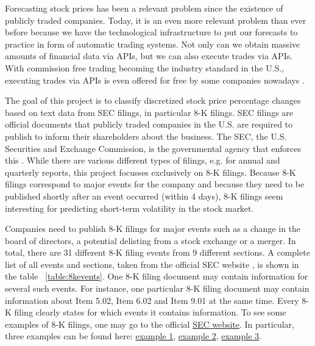 \documentclass{article}
\begin{document}
	Forecasting stock prices has been a relevant problem since the existence of publicly traded companies. Today, it is an even more relevant problem than ever before because we have the technological infrastructure to put our forecasts to practice in form of automatic trading systems. Not only can we obtain massive amounts of financial data via APIs, but we can also execute trades via APIs. With commission free trading becoming the industry standard in the U.S., executing trades via APIs is even offered for free by some companies nowadays \cite{noauthor_alpaca_nodate}. 
	
	The goal of this project is to classify discretized stock price percentage changes based on text data from SEC filings, in particular 8-K filings. SEC filings are official documents that publicly traded companies in the U.S. are required to publish to inform their shareholders about the business. The SEC, the U.S. Securities and Exchange Commission, is the governmental agency that enforces this \cite{noauthor_sec.gov_nodate-1}. While there are various different types of filings, e.g. for annual and quarterly reports, this project focusses exclusively on 8-K filings. Because 8-K filings correspond to major events for the company and because they need to be published shortly after an event occurred (within 4 days), 8-K filings seem interesting for predicting short-term volatility in the stock market. 
	
	Companies need to publish 8-K filings for major events such as a change in the board of directors, a potential delisting from a stock exchange or a merger. In total, there are 31 different 8-K filing events from 9 different sections. A complete list of all events and sections, taken from the official SEC website \cite{noauthor_sec.gov_nodate-1}, is shown in the table ~\ref{table:8kevents}. One 8-K filing document may contain information for several such events. For instance, one particular 8-K filing document may contain information about Item 5.02, Item 6.02 and Item 9.01 at the same time. Every 8-K filing clearly states for which events it contains information. To see some examples of 8-K filings, one may go to the official  \href{https://www.sec.gov/cgi-bin/browse-edgar?company=&CIK=&type=8-K&owner=include&count=40&action=getcurrent}{SEC website}. In particular, three examples can be found here: \href{https://www.sec.gov/ix?doc=/Archives/edgar/data/1339947/000119312519299728/d840037d8k.htm}{example 1}, \href{https://www.sec.gov/Archives/edgar/data/883975/000149315219018330/form8-k.htm}{example 2}, \href{https://www.sec.gov/Archives/edgar/data/1419275/000118518519001650/greenbox20191125_8k.htm}{example 3}.
	
\end{document}
